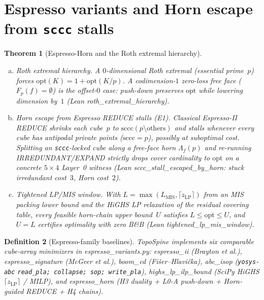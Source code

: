 \documentclass[11pt]{article}
\newtheorem{theorem}{Theorem}
\newtheorem{definition}[theorem]{Definition}
\begin{document}
\section{Espresso variants and Horn escape from \texttt{sccc} stalls}
\label{sec:espresso-horn}

\begin{theorem}[Espresso-Horn and the Roth extremal hierarchy]
\label{thm:espresso-horn}
\begin{enumerate}[(a)]
\item \emph{Roth extremal hierarchy.}  A $0$-dimensional Roth extremal (essential
prime~$p$) forces $\mathrm{opt}(K)=1+\mathrm{opt}(K/p)$.  A codimension-$1$
zero-loss free face ($F_p(f)=\emptyset$) is the offset-$0$ case: push-down
preserves $\mathrm{opt}$ while lowering dimension by~$1$ (Lean
\textsf{roth\_extremal\_hierarchy}).
\item \emph{Horn escape from Espresso \textsf{REDUCE} stalls (E1).}  Classical
Espresso-II \textsf{REDUCE} shrinks each cube~$p$ to
$\mathrm{sccc}(p\setminus\mathrm{others})$ and stalls whenever every cube has
antipodal private points ($\mathrm{sccc}=p$), possibly at suboptimal cost.
Splitting an \texttt{sccc}-locked cube along a free-face horn
$\Lambda_f(p)$ and re-running \textsf{IRREDUNDANT}/\textsf{EXPAND} strictly
drops cover cardinality to $\mathrm{opt}$ on a concrete $5\times 4$ Layer~0
witness (Lean \textsf{sccc\_stall\_escaped\_by\_horn}: stuck irredundant cost~$3$,
Horn cost~$2$).
\item \emph{Tightened LP/MIS window.}  With $L=\max(L_{\mathrm{MIS}},\lceil z_{\mathrm{LP}}\rceil)$
from an MIS packing lower bound and the HiGHS LP relaxation of the residual
covering table, every feasible horn-chain upper bound~$U$ satisfies
$L\le\mathrm{opt}\le U$, and $U=L$ certifies optimality with zero B\&B (Lean
\textsf{tightened\_lp\_mis\_window}).
\end{enumerate}
\end{theorem}

\begin{definition}[Espresso-family baselines]
\label{def:espresso-variants}
\textsf{TopoSpine} implements six comparable cube-array minimizers in
\textsf{espresso\_variants.py}:
\textsf{espresso\_ii} (Brayton et al.), \textsf{espresso\_signature} (McGeer et al.),
\textsf{boom\_cd} (Fi\v{s}er--Hlavi\v{c}ka), \textsf{abc\_isop} (\texttt{yosys-abc}
\texttt{read\_pla; collapse; sop; write\_pla}), \textsf{highs\_lp\_ilp\_bound}
(SciPy HiGHS $\lceil z_{\mathrm{LP}}\rceil$ / MILP), and \textsf{espresso\_horn}
(H3 duality + L0-A push-down + Horn-guided \textsf{REDUCE} + H4 chains).
\end{definition}
\end{document}
